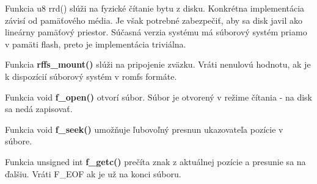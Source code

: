 Funkcia u8 rrd() slúži na fyzické čítanie bytu z disku. Konkrétna implementácia závisí od pamäťového média. Je však potrebné zabezpečiť, aby sa disk javil ako lineárny pamäťový priestor. Súčasná verzia systému má súborový systém priamo v pamäti flash, preto je implementácia triviálna.


Funkcia \textbf{rffs\_mount()} slúži na pripojenie zväzku. Vráti nenulovú hodnotu, ak je k dispozícií súborový systém v romfs formáte.

Funkcia void \textbf{f\_open()} otvorí súbor. Súbor je otvorený v režime čítania - na disk sa nedá zapisovať.

Funkcia void \textbf{f\_seek()} umožňuje ľubovoľný presnun ukazovateľa pozície v súbore.

Funkcia unsigned int \textbf{f\_getc()} prečíta znak z aktuálnej pozície a presunie sa na ďalšiu. Vráti F\_EOF ak je už na konci súboru.
